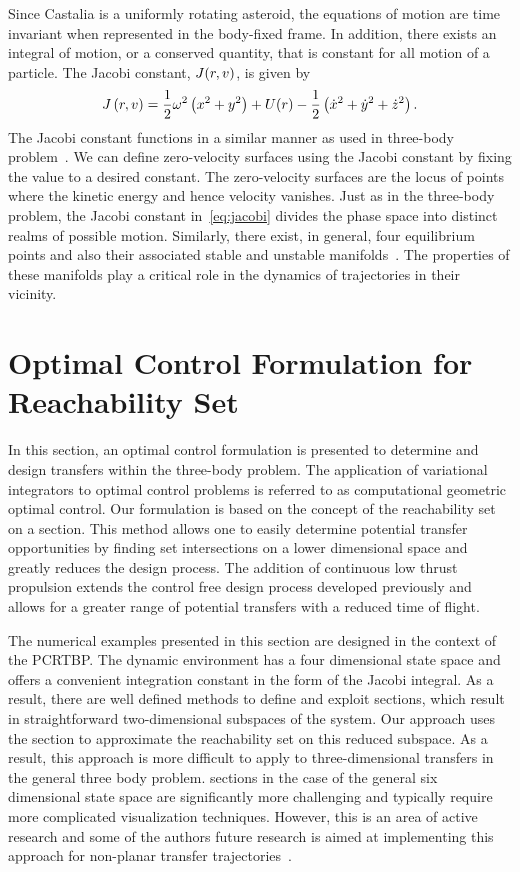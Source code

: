 Since Castalia is a uniformly rotating asteroid, the equations of motion are time invariant when represented in the body-fixed frame.
In addition, there exists an integral of motion, or a conserved quantity, that is constant for all motion of a particle.
The Jacobi constant, \( J (r , v ) \), is given by
\begin{align}\label{eq:jacobi}
    J \left( r, v \right) = \frac{1}{2} \omega^2 \left( x^2 + y^2 \right) + U(r) - \frac{1}{2} \left( \dot{x}^2 + \dot{y}^2 + \dot{z}^2 \right) .
\end{align}
The Jacobi constant functions in a similar manner as used in three-body problem~\cite{szebehely1967}.
We can define zero-velocity surfaces using the Jacobi constant by fixing the value to a desired constant.
The zero-velocity surfaces are the locus of points where the kinetic energy and hence velocity vanishes.
Just as in the three-body problem, the Jacobi constant in~\cref{eq:jacobi} divides the phase space into distinct realms of possible motion.
Similarly, there exist, in general, four equilibrium points and also their associated stable and unstable manifolds~\cite{scheeres1996,scheeres1994}.
The properties of these manifolds play a critical role in the dynamics of trajectories in their vicinity.

\section{Optimal Control Formulation for Reachability Set}\label{sec:optimal_control}
In this section, an optimal control formulation is presented to determine and design transfers within the three-body problem.
The application of variational integrators to optimal control problems is referred to as computational geometric optimal control.
Our formulation is based on the concept of the reachability set on a \Poincare section.
This method allows one to easily determine potential transfer opportunities by finding set intersections on a lower dimensional space and greatly reduces the design process.
The addition of continuous low thrust propulsion extends the control free design process developed previously and allows for a greater range of potential transfers with a reduced time of flight.

The numerical examples presented in this section are designed in the context of the PCRTBP.
The dynamic environment has a four dimensional state space and offers a convenient integration constant in the form of the Jacobi integral.
As a result, there are well defined methods to define and exploit \Poincare sections, which result in straightforward two-dimensional subspaces of the system.
Our approach uses the \Poincare section to approximate the reachability set on this reduced subspace.
As a result, this approach is more difficult to apply to three-dimensional transfers in the general three body problem.
\Poincare sections in the case of the general six dimensional state space are significantly more challenging and typically require more complicated visualization techniques. 
However, this is an area of active research and some of the authors future research is aimed at implementing this approach for non-planar transfer trajectories~\cite{kulumani2016d}.

